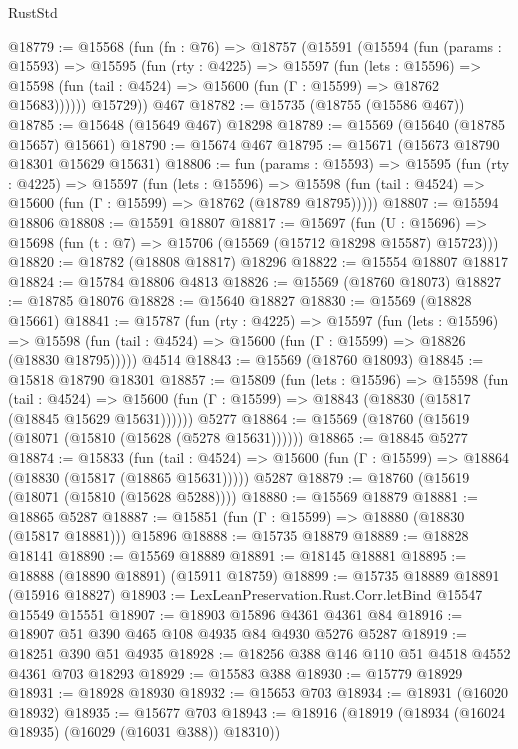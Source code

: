 \begin{lexlean}{RustStd}
\begin{coremodule}
@18779 := @15568
    (fun (fn : @76) =>
    @18757
      (@15591
        (@15594
          (fun (params : @15593) =>
          @15595
            (fun (rty : @4225) =>
            @15597
              (fun (lets : @15596) =>
              @15598 (fun (tail : @4524) => @15600 (fun (Γ : @15599) => @18762 @15683))))))
        @15729))
    @467
@18782 := @15735 (@18755 (@15586 @467))
@18785 := @15648 (@15649 @467) @18298
@18789 := @15569 (@15640 (@18785 @15657) @15661)
@18790 := @15674 @467
@18795 := @15671 (@15673 @18790 @18301 @15629 @15631)
@18806 := fun (params : @15593) =>
  @15595
    (fun (rty : @4225) =>
    @15597
      (fun (lets : @15596) =>
      @15598 (fun (tail : @4524) => @15600 (fun (Γ : @15599) => @18762 (@18789 @18795)))))
@18807 := @15594 @18806
@18808 := @15591 @18807
@18817 := @15697
    (fun (U : @15696) => @15698 (fun (t : @7) => @15706 (@15569 (@15712 @18298 @15587) @15723)))
@18820 := @18782 (@18808 @18817) @18296
@18822 := @15554 @18807 @18817
@18824 := @15784 @18806 @4813
@18826 := @15569 (@18760 @18073)
@18827 := @18785 @18076
@18828 := @15640 @18827
@18830 := @15569 (@18828 @15661)
@18841 := @15787
    (fun (rty : @4225) =>
    @15597
      (fun (lets : @15596) =>
      @15598 (fun (tail : @4524) => @15600 (fun (Γ : @15599) => @18826 (@18830 @18795)))))
    @4514
@18843 := @15569 (@18760 @18093)
@18845 := @15818 @18790 @18301
@18857 := @15809
    (fun (lets : @15596) =>
    @15598
      (fun (tail : @4524) =>
      @15600 (fun (Γ : @15599) => @18843 (@18830 (@15817 (@18845 @15629 @15631))))))
    @5277
@18864 := @15569 (@18760 (@15619 (@18071 (@15810 (@15628 (@5278 @15631))))))
@18865 := @18845 @5277
@18874 := @15833
    (fun (tail : @4524) => @15600 (fun (Γ : @15599) => @18864 (@18830 (@15817 (@18865 @15631)))))
    @5287
@18879 := @18760 (@15619 (@18071 (@15810 (@15628 @5288))))
@18880 := @15569 @18879
@18881 := @18865 @5287
@18887 := @15851 (fun (Γ : @15599) => @18880 (@18830 (@15817 @18881))) @15896
@18888 := @15735 @18879
@18889 := @18828 @18141
@18890 := @15569 @18889
@18891 := @18145 @18881
@18895 := @18888 (@18890 @18891) (@15911 @18759)
@18899 := @15735 @18889 @18891 (@15916 @18827)
@18903 := LexLeanPreservation.Rust.Corr.letBind @15547 @15549 @15551
@18907 := @18903 @15896 @4361 @4361 @84
@18916 := @18907 @51 @390 @465 @108 @4935 @84 @4930 @5276 @5287
@18919 := @18251 @390 @51 @4935
@18928 := @18256 @388 @146 @110 @51 @4518 @4552 @4361 @703 @18293
@18929 := @15583 @388
@18930 := @15779 @18929
@18931 := @18928 @18930
@18932 := @15653 @703
@18934 := @18931 (@16020 @18932)
@18935 := @15677 @703
@18943 := @18916 (@18919 (@18934 (@16024 @18935) (@16029 (@16031 @388)) @18310))

\end{coremodule}
\end{lexlean}
